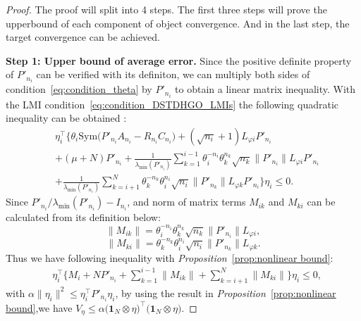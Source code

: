 \documentclass{ifacconf}
\begin{document}
\begin{proof}
The proof will split into 4 steps. The first three steps will prove the upperbound of each component of object convergence. And in the last step, the target convergence can be achieved.

\textbf{Step 1: Upper bound of average error.}
Since the positive definite property of $P'_{n_i}$ can be verified with its definiton, we can multiply both sides of condition~\eqref{eq:condition_theta} by $P'_{n_i}$ to obtain a linear matrix inequality.
With the LMI condition~\eqref{eq:condition_DSTDHGO_LMIs} the following quadratic inequality can be obtained : 
\begin{align}
            & \eta_i^\top\bigg\{\theta_i\mathrm{Sym}\big(P'_{n_i}A_{n_i}-R_{n_i}C_{n_i}\big) +(\sqrt{n_i}+1)L_{\varphi i}P'_{n_i}  \nonumber\\
            &+(\mu+N)P'_{n_i}+ \frac{1}{\lambda_{\min}(P'_{n_i})} \sum_{k=1}^{i-1} \theta_i^{-n_i}\theta_k^{n_k}\sqrt{n_k}\|P'_{n_i}\|L_{\varphi i}P'_{n_i} \nonumber\\
           & + \frac{1}{\lambda_{\min}(P'_{n_i})} \sum_{k=i+1}^{N} \theta_k^{-n_k}\theta_i^{n_i}\sqrt{n_i}\|P'_{n_k}\|L_{\varphi k}P'_{n_i}\bigg\}\eta_i\le0.
\end{align}
Since $P'_{n_i}/\lambda_{\min}(P'_{n_i})-I_{n_i}$, and norm of matrix terms $M_{ik}$ and $M_{ki}$ can be calculated from its definition below:
\[\|M_{ik}\|=\theta_i^{-n_i}\theta_k^{n_k}\sqrt{n_k}\|P'_{n_i}\|L_{\varphi i},\]
\[\|M_{ki}\|=\theta_k^{-n_k}\theta_i^{n_i}\sqrt{n_i}\|P'_{n_k}\|L_{\varphi k}.\]
Thus we have following inequality with {\it Proposition}~\ref{prop:nonlinear bound}:
\begin{equation}
    \begin{aligned}
         & \eta_i^\top\bigg\{M_i +NP'_{n_i}+ \sum_{k=1}^{i-1} \big\|M_{ik}\big\| + \sum_{k=i+1}^{N} \big\|M_{ki}\big\|\bigg\}\eta_i\le0,    
    \end{aligned}
\end{equation}
with $\alpha\|\eta_i\|^2\le\eta_i^\top P'_{n_i}\eta_i$, by using the result in {\it Proposition}~\ref{prop:nonlinear bound},we have $V_\eta\le \alpha\big(\mathbf{1}_N\otimes\eta\big)^\top\big(\mathbf{1}_N\otimes\eta\big)$.


\end{proof}
\end{document}
